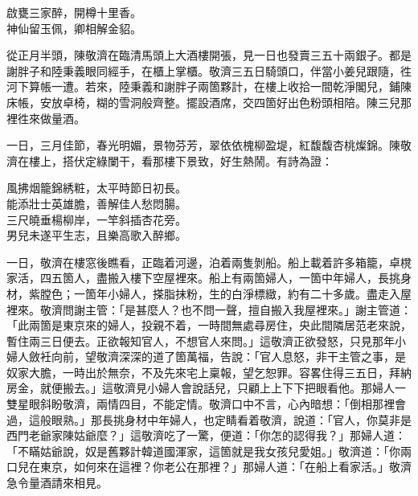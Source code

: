 \begin{myquote}
啟甕三家醉，開樽十里香。\\神仙留玉佩，卿相解金貂。
\end{myquote}

從正月半頭，陳敬濟在臨清馬頭上大酒樓開張，見一日也發賣三五十兩銀子。都是謝胖子和陸秉義眼同經手，在櫃上掌櫃。敬濟三五日騎頭口，伴當小姜兒跟隨，徃河下算帳一遭。若來，陸秉義和謝胖子兩箇夥計，在樓上收拾一間乾淨閣兒，鋪陳床帳，安放卓椅，糊的雪洞般齊整。擺設酒席，交四箇好出色粉頭相陪。陳三兒那裡徃來做量酒。

一日，三月佳節，春光明媚，景物芬芳，翠依依槐柳盈堤，紅馥馥杏桃燦錦。陳敬濟在樓上，搭伏定綠闌干，看那樓下景致，好生熱鬧。有詩為證：

\begin{myquote}
風拂烟籠錦綉粧，太平時節日初長。\\能添壯士英雄膽，善解佳人愁悶腸。\\三尺曉垂楊柳岸，一竿斜插杏花旁。\\男兒未遂平生志，且樂高歌入醉鄉。
\end{myquote}

一日，敬濟在樓窓後瞧看，正臨着河邊，泊着兩隻剝船。船上載着許多箱籠，卓櫈家活，四五箇人，盡搬入樓下空屋裡來。船上有兩箇婦人，{}一箇中年婦人，長挑身材，紫膛色；一箇年小婦人，搽脂抹粉，生的白淨標緻，約有二十多歲。盡走入屋裡來。{}敬濟問謝主管：「是甚麼人？也不問一聲，擅自搬入我屋裡來。」謝主管道：「此兩箇是東京來的婦人，投親不着，一時間無處尋房住，央此間隣居范老來說，暫住兩三日便去。正欲報知官人，不想官人來問。」這敬濟正欲發怒，只見那年小婦人斂衽向前，望敬濟深深的道了箇萬福，告說：「官人息怒，非干主管之事，是奴家大膽，一時出於無奈，不及先來宅上稟報，望乞恕罪。容畧住得三五日，拜納房金，就便搬去。」這敬濟見小婦人會說話兒，只顧上上下下把眼看他。那婦人一雙星眼斜盼敬濟，兩情四目，不能定情。{}敬濟口中不言，心內暗想：「倒相那裡會過，這般眼熟。」那長挑身材中年婦人，也定睛看着敬濟，說道：「官人，你莫非是西門老爺家陳姑爺麼？」這敬濟吃了一驚，便道：「你怎的認得我？」那婦人道：「不瞞姑爺說，奴是舊夥計韓道國渾家，這箇就是我女孩兒愛姐。」敬濟道：「你兩口兒在東京，如何來在這裡？你老公在那裡？」{}那婦人道：「在船上看家活。」敬濟急令量酒請來相見。

